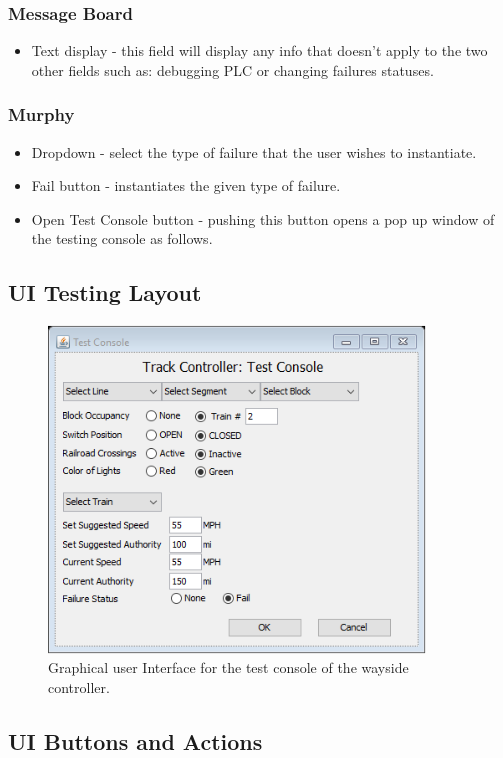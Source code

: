 \documentclass[letterpaper]{article}
\begin{document}
\subsubsection{Message Board}
\begin{itemize}
	\item Text display - this field will display any info that doesn't apply to the two other fields such as: debugging PLC or changing failures statuses.
\end{itemize}
\subsubsection{Murphy}
\begin{itemize}
	\item Dropdown - select the type of failure that the user wishes to instantiate.
	\item Fail button - instantiates the given type of failure.
	\item Open Test Console button - pushing this button opens a pop up window of the testing console as follows.
\end{itemize}


\subsection{UI Testing Layout}

\begin{figure}
	\center
	\includegraphics[width=10cm]{trackcontrollertestconsole_gui}
	\caption{Graphical user Interface for the test console of the wayside controller.}
\end{figure}


\subsection{UI Buttons and Actions}
\end{document}
